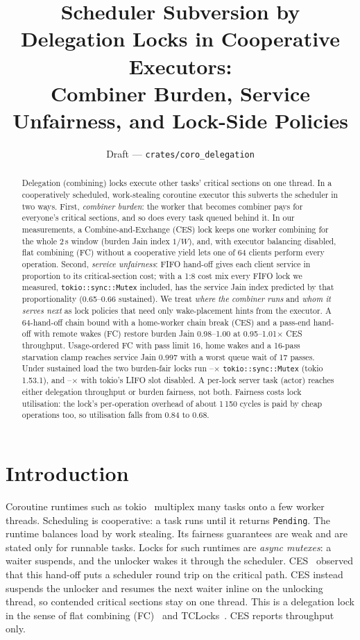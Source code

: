 \documentclass[10pt,twocolumn]{article}
\title{Scheduler Subversion by Delegation Locks in Cooperative Executors:\\
Combiner Burden, Service Unfairness, and Lock-Side Policies}
\author{Draft --- \texttt{crates/coro\_delegation}}
\date{}
\newcommand{\lk}[1]{\texttt{#1}}
\begin{document}
\maketitle

\begin{abstract}
Delegation (combining) locks execute other tasks' critical sections on one
thread. In a cooperatively scheduled, work-stealing coroutine executor this
subverts the scheduler in two ways. First, \emph{combiner burden}: the worker
that becomes combiner pays for everyone's critical sections, and so does every
task queued behind it. In our measurements, a Combine-and-Exchange (CES) lock
keeps one worker combining for the whole 2\,s window (burden Jain index $1/W$),
and, with executor balancing disabled, flat combining (FC) without a
cooperative yield lets one of 64 clients
perform every operation. Second, \emph{service unfairness}: FIFO hand-off gives
each client service in proportion to its critical-section cost; with a 1:8
cost mix every FIFO lock we measured, \lk{tokio::sync::Mutex} included, has the
service Jain index predicted by that proportionality (0.65--0.66 sustained). We treat
\emph{where the combiner runs} and \emph{whom it serves next} as lock policies
that need only wake-placement hints from the executor. A 64-hand-off chain
bound with a home-worker chain break (CES) and a pass-end hand-off with remote
wakes (FC) restore burden Jain 0.98--1.00 at 0.95--1.01$\times$ CES
throughput. Usage-ordered FC with pass limit 16, home wakes and a 16-pass
starvation clamp reaches service Jain 0.997 with a worst queue wait of
17 passes. Under sustained load the two burden-fair locks run
\SusOnLo--\SusOnHi$\times$ \lk{tokio::sync::Mutex} (tokio 1.53.1), and
\SusOffLo--\SusOffHi$\times$ with tokio's LIFO slot disabled. A per-lock
server task (actor) reaches either delegation throughput or burden fairness,
not both. Fairness costs lock utilisation: the lock's per-operation overhead of
about 1\,150 cycles is paid by cheap operations too, so utilisation falls from
0.84 to 0.68.
\end{abstract}

\section{Introduction}\label{sec:intro}

Coroutine runtimes such as tokio~\cite{tokio} multiplex many tasks onto a few
worker threads. Scheduling is cooperative: a task runs until it returns
\lk{Pending}. The runtime balances load by work stealing. Its fairness
guarantees are weak and are stated only for runnable tasks. Locks for such
runtimes are \emph{async mutexes}: a waiter suspends, and the unlocker wakes
it through the scheduler. CES~\cite{ces} observed that this hand-off puts a
scheduler round trip on the critical path. CES instead suspends the unlocker
and resumes the next waiter inline on the unlocking thread, so contended
critical sections stay on one thread. This is a delegation lock in the sense
of flat combining (FC)~\cite{fc} and TCLocks~\cite{tclocks}. CES reports
throughput only.
\end{document}
